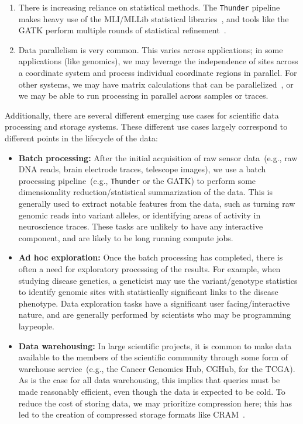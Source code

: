 \documentclass{acm_proc_article-sp}
\begin{document}
\begin{enumerate}
\item There is increasing reliance on statistical methods. The \texttt{Thunder} pipeline makes heavy use
of the MLI/MLLib statistical libraries~\cite{freeman14, sparks13}, and tools like the GATK perform multiple
rounds of statistical refinement~\cite{depristo11}.
\item Data parallelism is very common. This varies across applications; in some applications (like
genomics), we may leverage the independence of sites across a coordinate system and process
individual coordinate regions in parallel. For other systems, we may have matrix calculations that can
be parallelized~\cite{sparks13}, or we may be able to run processing in parallel across samples or traces.
\end{enumerate}

Additionally, there are several different emerging use cases for scientific data processing and storage
systems. These different use cases largely correspond to different points in the lifecycle of the data:

\begin{itemize}
\item \textbf{Batch processing:} After the initial acquisition of raw sensor data~(e.g., raw DNA reads,
brain electrode traces, telescope images), we use a batch processing pipeline~(e.g., \texttt{Thunder} or
the GATK) to perform some dimensionality reduction/statistical summarization of the data. This is
generally used to extract notable features from the data, such as turning raw genomic reads into variant
alleles, or identifying areas of activity in neuroscience traces. These tasks are unlikely to have any
interactive component, and are likely to be long running compute jobs.
\item \textbf{Ad hoc exploration:} Once the batch processing has completed, there is often a need
for exploratory processing of the results. For example, when studying disease genetics, a geneticist may
use the variant/genotype statistics to identify genomic sites with statistically significant links to the
disease phenotype. Data exploration tasks have a significant user facing/interactive nature, and are
generally performed by scientists who may be programming laypeople.
\item \textbf{Data warehousing:} In large scientific projects, it is common to make data available to the
members of the scientific community through some form of warehouse service~(e.g., the Cancer
Genomics Hub, CGHub, for the TCGA). As is the case for all data warehousing, this implies that queries
must be made reasonably efficient, even though the data is expected to be cold. To reduce the cost of
storing data, we may prioritize compression here; this has led to the creation of compressed storage
formats like CRAM~\cite{fritz11}.
\end{itemize}
\end{document}
